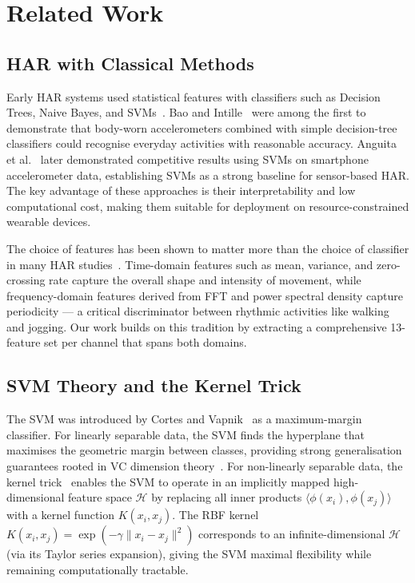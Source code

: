 \documentclass[10pt,twocolumn,letterpaper]{article}
\begin{document}
\section{Related Work}

\subsection{HAR with Classical Methods}
Early HAR systems used statistical features with classifiers such as Decision Trees, Naive Bayes, and SVMs~\cite{bao2004activity}. Bao and Intille~\cite{bao2004activity} were among the first to demonstrate that body-worn accelerometers combined with simple decision-tree classifiers could recognise everyday activities with reasonable accuracy. Anguita et al.~\cite{anguita2013public} later demonstrated competitive results using SVMs on smartphone accelerometer data, establishing SVMs as a strong baseline for sensor-based HAR. The key advantage of these approaches is their interpretability and low computational cost, making them suitable for deployment on resource-constrained wearable devices.

The choice of features has been shown to matter more than the choice of classifier in many HAR studies~\cite{bulling2014tutorial}. Time-domain features such as mean, variance, and zero-crossing rate capture the overall shape and intensity of movement, while frequency-domain features derived from FFT and power spectral density capture periodicity --- a critical discriminator between rhythmic activities like walking and jogging. Our work builds on this tradition by extracting a comprehensive 13-feature set per channel that spans both domains.

\subsection{SVM Theory and the Kernel Trick}
The SVM was introduced by Cortes and Vapnik~\cite{cortes1995support} as a maximum-margin classifier. For linearly separable data, the SVM finds the hyperplane that maximises the geometric margin between classes, providing strong generalisation guarantees rooted in VC dimension theory~\cite{vapnik1995nature}. For non-linearly separable data, the kernel trick~\cite{scholkopf2002learning} enables the SVM to operate in an implicitly mapped high-dimensional feature space $\mathcal{H}$ by replacing all inner products $\langle \phi(x_i), \phi(x_j) \rangle$ with a kernel function $K(x_i, x_j)$. The RBF kernel $K(x_i, x_j) = \exp(-\gamma\|x_i - x_j\|^2)$ corresponds to an infinite-dimensional $\mathcal{H}$ (via its Taylor series expansion), giving the SVM maximal flexibility while remaining computationally tractable.
\end{document}
